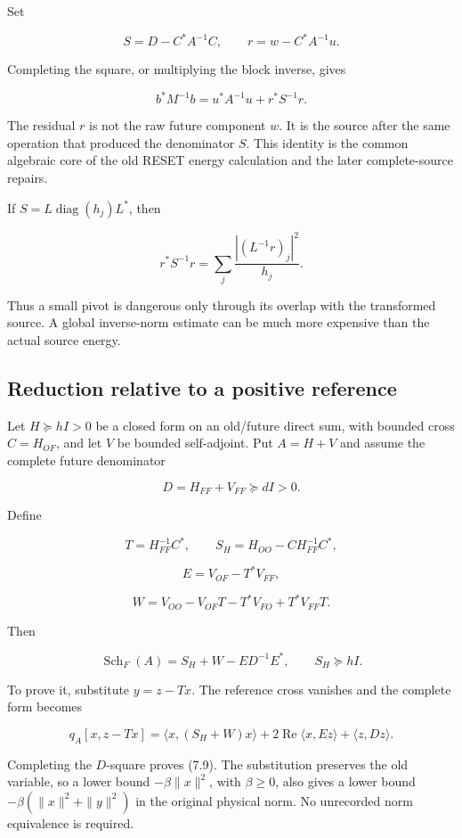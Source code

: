 \documentclass[
  10pt,
  a4paper,
  10pt,
  oneside,
  openany]{book}
\begin{document}
Set

\[
S=D-C^*A^{-1}C,
\qquad r=w-C^*A^{-1}u.
\tag{7.2}\label{eq:7.2}
\]

Completing the square, or multiplying the block inverse, gives

\[
b^*M^{-1}b=u^*A^{-1}u+r^*S^{-1}r.
\tag{7.3}\label{eq:7.3}
\]

The residual \(r\) is not the raw future component \(w\). It is the
source after the same operation that produced the denominator \(S\).
This identity is the common algebraic core of the old RESET energy
calculation and the later complete-source repairs.

If \(S=L\operatorname{diag}(h_j)L^*\), then

\[
r^*S^{-1}r=\sum_j\frac{|(L^{-1}r)_j|^2}{h_j}.
\tag{7.4}\label{eq:7.4}
\]

Thus a small pivot is dangerous only through its overlap with the
transformed source. A global inverse-norm estimate can be much more
expensive than the actual source energy.

\subsection{Reduction relative to a positive
reference}\label{reduction-relative-to-a-positive-reference}

Let \(H\succeq hI>0\) be a closed form on an old/future direct sum, with
bounded cross \(C=H_{OF}\), and let \(V\) be bounded self-adjoint. Put
\(A=H+V\) and assume the complete future denominator

\[
D=H_{FF}+V_{FF}\succeq dI>0.
\tag{7.5}\label{eq:7.5}
\]

Define

\[
T=H_{FF}^{-1}C^*,
\qquad S_H=H_{OO}-CH_{FF}^{-1}C^*,
\tag{7.6}\label{eq:7.6}
\]

\[
E=V_{OF}-T^*V_{FF},
\tag{7.7}\label{eq:7.7}
\]

\[
W=V_{OO}-V_{OF}T-T^*V_{FO}+T^*V_{FF}T.
\tag{7.8}\label{eq:7.8}
\]

Then

\[
\operatorname{Sch}_F(A)=S_H+W-ED^{-1}E^*,
\qquad S_H\succeq hI.
\tag{7.9}\label{eq:7.9}
\]

To prove it, substitute \(y=z-Tx\). The reference cross vanishes and the
complete form becomes

\[
q_A[x,z-Tx]
=\langle x,(S_H+W)x\rangle
+2\operatorname{Re}\langle x,Ez\rangle
+\langle z,Dz\rangle.
\tag{7.10}\label{eq:7.10}
\]

Completing the \(D\)-square proves (7.9). The substitution preserves the
old variable, so a lower bound \(-\beta\|x\|^2\), with \(\beta\ge0\),
also gives a lower bound \(-\beta(\|x\|^2+\|y\|^2)\) in the original
physical norm. No unrecorded norm equivalence is required.
\end{document}
